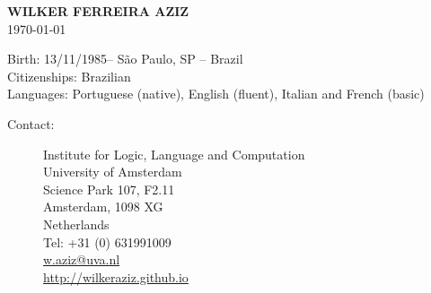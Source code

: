 \documentclass[10pt,a4paper,oneside]{article}
\makeatletter
\newcommand{\myname}{WILKER FERREIRA AZIZ\xspace}
\newcommand{\birthday}{13/11/1985\xspace}
\newcommand{\location}{S\~ao Paulo, SP -- Brazil\xspace}
\newcommand{\citizenships}{Brazilian\xspace}
\newcommand{\contact}{Institute for Logic, Language and Computation \\
University of Amsterdam \\
Science Park 107, F2.11 \\
Amsterdam, 1098 XG \\
Netherlands  \\
Tel: +31 (0) 631991009 \\
\url{w.aziz@uva.nl} \\
\url{http://wilkeraziz.github.io} 
}
\makeatother
\begin{document}




\begin{center}
{\large \bf
\myname \\
}
{\small
\today \\
}
\end{center}

Birth: \birthday -- \location \\
Citizenships: \citizenships \\
Languages: Portuguese (native), English (fluent), Italian and French (basic)
\vspace{2mm}
\begin{description}
	\item[Contact:] \contact
\end{description}










\end{document}
